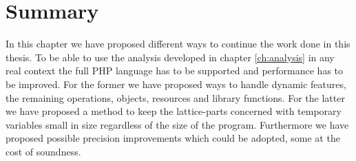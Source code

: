 \section{Summary}
In this chapter we have proposed different ways to continue the work done in this thesis. To be able to use the analysis developed in chapter \ref{ch:analysis} in any real context the full PHP language has to be supported and performance has to be improved. For the former we have proposed ways to handle dynamic features, the remaining operations, objects, resources and library functions. For the latter we have proposed a method to keep the lattice-parts concerned with temporary variables small in size regardless of the size of the program. Furthermore we have proposed possible precision improvements which could be adopted, some at the cost of soundness.